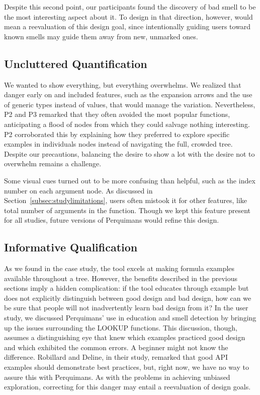 \documentclass[conference]{IEEEtran}
\newcommand{\toolname}{Perquimans\xspace} \newcommand{\toolnameend}{Perquimans}
\newcommand{\toolnameposs}{Perquimans' }
\begin{document}
	Despite this second point, our participants found the discovery of bad smell
	to be the most interesting aspect about it. To design in that
	direction, however, would mean a reevaluation of this design goal, since
	intentionally guiding users toward known smells may guide them away from new,
	unmarked ones.
	
	\subsection{Uncluttered Quantification}
	
	We wanted to show everything, but everything overwhelms. We realized that danger
	early on and included features, such as the expansion arrows and the use of generic types
	instead of values, that would manage the variation. Nevertheless, P2 and P3 remarked
	that they often avoided the most popular functions, anticipating a flood
	of nodes from which they could salvage nothing interesting. P2 corroborated
	this by explaining how they preferred to explore specific examples in
	individuals nodes instead of navigating the full, crowded tree. Despite our
	precautions, balancing the desire to show a lot with the desire not to
	overwhelm remains a challenge. \par
	
	Some visual cues turned out to be more confusing than helpful, such as
	the index number on each argument node. As discussed in Section~\ref{subsec:studylimitations},
	users often mistook it for other features, like total number of arguments in the
	function. Though we kept this feature present for all studies, future versions
	of \toolname would refine this design. 
	
	\subsection{Informative Qualification}
	
	As we found in the case study, the tool excels at making formula examples
	available throughout a tree. However, the benefits described in the previous
	sections imply a hidden complication: if the tool educates through example but
	does not explicitly distinguish between good design and bad design, how can we
	be sure that people will not inadvertently learn bad design from it? In the
	user study, we discussed \toolnameposs use in education and smell detection by bringing
	up the issues surrounding the LOOKUP functions. This discussion, though,
	assumes a distinguishing eye that knew which examples practiced good design
	and which exhibited the common errors. A beginner might not know the
	difference. Robillard and Deline, in their study, remarked that good API
	examples should demonstrate best practices, but, right now, we have no way to
	assure this with \toolnameend. As with the problems in achieving unbiased
	exploration, correcting for this danger may entail a reevaluation of design
	goals.
	
\end{document}
